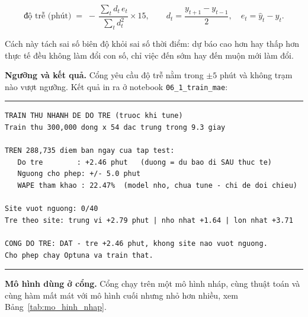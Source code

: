 \documentclass[12pt, a4paper]{report}
\begin{document}
\begin{equation}
\text{độ trễ (phút)} \;=\; -\,\frac{\sum_t d_t \, e_t}{\sum_t d_t^{2}} \times 15,
\qquad
d_t = \frac{y_{t+1} - y_{t-1}}{2}, \quad e_t = \hat{y}_t - y_t .
\end{equation}

Cách này tách sai số biên độ khỏi sai số thời điểm: dự báo cao hơn hay thấp hơn thực tế
đều không làm đổi con số, chỉ việc đến sớm hay đến muộn mới làm đổi.

\textbf{Ngưỡng và kết quả.} Cổng yêu cầu độ trễ nằm trong $\pm 5$ phút và không trạm nào vượt
ngưỡng. Kết quả in ra ở notebook \texttt{06\_1\_train\_mae}:

\begingroup
\par\vspace{6pt}\hrule\vspace{4pt}
\small\renewcommand{\baselinestretch}{1.0}\selectfont
\begin{verbatim}
TRAIN THU NHANH DE DO TRE (truoc khi tune)
Train thu 300,000 dong x 54 dac trung trong 9.3 giay

TREN 288,735 diem ban ngay cua tap test:
   Do tre        : +2.46 phut   (duong = du bao di SAU thuc te)
   Nguong cho phep: +/- 5.0 phut
   WAPE tham khao : 22.47%  (model nho, chua tune - chi de doi chieu)

Site vuot nguong: 0/40
Tre theo site: trung vi +2.79 phut | nho nhat +1.64 | lon nhat +3.71

CONG DO TRE: DAT - tre +2.46 phut, khong site nao vuot nguong.
Cho phep chay Optuna va train that.
\end{verbatim}
\vspace{2pt}\hrule\par\vspace{6pt}
\endgroup

\textbf{Mô hình dùng ở cổng.} Cổng chạy trên một mô hình nháp, cùng thuật toán và cùng hàm
mất mát với mô hình cuối nhưng nhỏ hơn nhiều, xem Bảng~\ref{tab:mo_hinh_nhap}.
\end{document}
